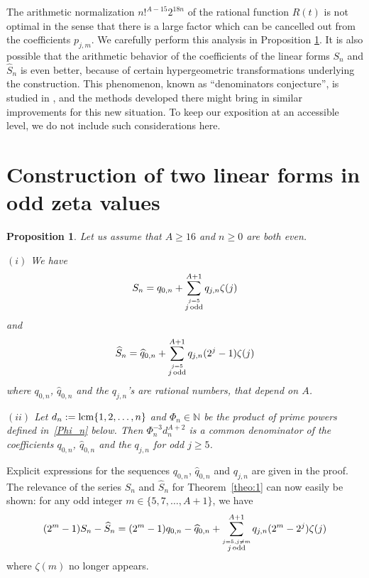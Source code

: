 \documentclass[reqno,12pt]{article}
\newtheorem{prop}{Proposition}
\theoremstyle{remark}
\begin{document}
The arithmetic normalization $n!^{A-15}2^{18n}$ of the rational function $R(t)$ is not optimal in the sense that there is a large factor 
which can be cancelled out from the coefficients $p_{j,m}$. We carefully perform this analysis in Proposition \ref{prop:1}.
It is also possible that the arithmetic behavior of the  coefficients of the linear forms $S_n$ and $\widehat{S}_n$ is even better, because of
certain hypergeometric transformations underlying the construction. This phenomenon, known as ``denominators conjecture'',
is studied in \cite{kratriv}, and the methods developed there might bring in similar improvements for this new
situation. To keep our exposition at an accessible level, we do not include such considerations here.



\section{Construction of two linear forms in odd zeta values} \label{sec:2}

\begin{prop}\label{prop:1} Let us assume that $A\ge 16$ and $n\ge 0$ are both even.

\medskip
$(i)$ We have
\begin{equation}\label{eq:6}
S_n= q_{0,n}+\sum_{\stackrel{j=5}{j\, \textup{odd}}}^{A+1} q_{j,n} \zeta(j)
\end{equation}
and
\begin{equation}\label{eq:7}
\widehat{S}_n= \widehat{q}_{0,n}+\sum_{\stackrel{j=5}{j\, \textup{odd}}}^{A+1} q_{j,n} (2^j-1)\zeta(j)
\end{equation}
where $q_{0,n}$, $\widehat{q}_{0,n}$ and the $q_{j,n}$'s are rational numbers, that depend on $A$.
\medskip

$(ii)$ Let $d_n:=\textup{lcm}\{1,2,\ldots,n\}$ and
$\Phi_n\in \mathbb N$ be the product of prime powers defined in~\eqref{Phi_n} below. Then $\Phi_n^{-3}d_n^{A+2}$ is a common denominator of the coefficients 
$q_{0,n}$, $\widehat{q}_{0,n}$ and the $q_{j,n}$ for odd $j\ge 5$.
\end{prop}
Explicit expressions for the sequences $q_{0,n}$, $\widehat{q}_{0,n}$ and $q_{j,n}$ are given in the proof. The relevance of the series $S_n$ and $\widehat{S}_n$ for Theorem~\ref{theo:1} can now easily be shown: for any odd integer $m\in \{5,7,\ldots, A+1\}$, we have
$$
(2^m-1)S_n-\widehat{S}_n=(2^m-1)q_{0,n}-\widehat{q}_{0,n}+\sum_{\stackrel{j=5, j\neq m}{j\, \textup{odd}}}^{A+1} q_{j,n} (2^m-2^j)\zeta(j)
$$
where $\zeta(m)$ no longer appears.
\end{document}
